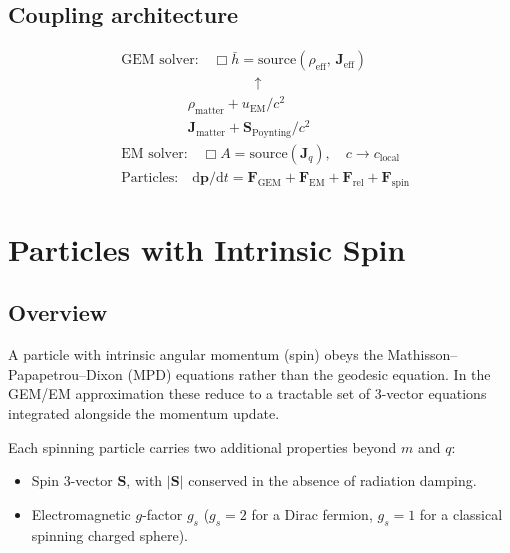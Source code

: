 \documentclass[11pt,a4paper]{article}
\newcommand{\vv}[1]{\mathbf{#1}}
\newcommand{\dd}{\mathrm{d}}
\begin{document}
\subsection{Coupling architecture}

\begin{eqbox}
\begin{equation*}
\begin{aligned}
&\text{GEM solver:}\quad \Box\bar{h} = \mathrm{source}(\rho_{\mathrm{eff}},\,\vv{J}_{\mathrm{eff}}) \\
&\hspace{4cm}\uparrow \\
&\hspace{2cm} \rho_{\mathrm{matter}} + u_{\mathrm{EM}}/c^2 \\
&\hspace{2cm} \vv{J}_{\mathrm{matter}} + \vv{S}_{\mathrm{Poynting}}/c^2 \\[6pt]
&\text{EM solver:}\quad \Box A = \mathrm{source}(\vv{J}_q),\quad c\to c_{\mathrm{local}} \\[6pt]
&\text{Particles:}\quad \dd\vv{p}/\dd t = \vv{F}_{\mathrm{GEM}} + \vv{F}_{\mathrm{EM}} + \vv{F}_{\mathrm{rel}} + \vv{F}_{\mathrm{spin}}
\end{aligned}
\end{equation*}
\end{eqbox}

\section{Particles with Intrinsic Spin}
\label{sec:spin}

\subsection{Overview}

A particle with intrinsic angular momentum (spin) obeys the Mathisson--Papapetrou--Dixon (MPD) equations rather than the geodesic equation.  In the GEM/EM approximation these reduce to a tractable set of 3-vector equations integrated alongside the momentum update.

Each spinning particle carries two additional properties beyond $m$ and $q$:
\begin{itemize}
  \item Spin 3-vector $\vv{S}$, with $|\vv{S}|$ conserved in the absence of radiation damping.
  \item Electromagnetic $g$-factor $g_s$ ($g_s=2$ for a Dirac fermion, $g_s=1$ for a classical spinning charged sphere).
\end{itemize}
\end{document}

